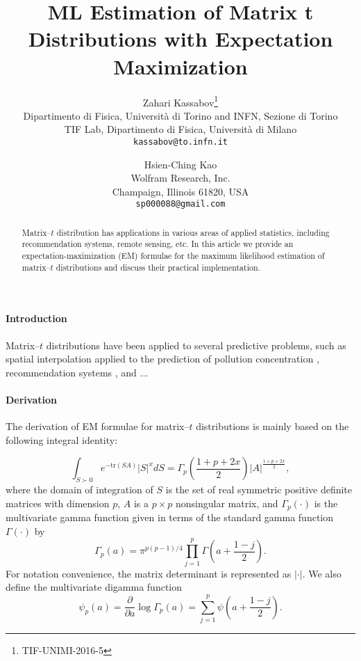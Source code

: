 \documentclass[english,listof=totoc]{scrartcl}
\title{ML Estimation of Matrix t Distributions with Expectation Maximization}
\author{Zahari Kassabov\thanks{TIF-UNIMI-2016-5}\\
        Dipartimento di Fisica, Universit\`a di Torino and INFN, Sezione di Torino\\
		TIF Lab, Dipartimento di Fisica, Universit\`a di Milano\\
        \texttt{kassabov@to.infn.it}\\
        \and
        Hsien-Ching Kao\\
        Wolfram Research, Inc.\\
		Champaign, Illinois 61820, USA\\
		\texttt{sp000088@gmail.com}
		}
\begin{document}
\maketitle

\begin{abstract}
Matrix--$t$ distribution has applications in various areas of applied statistics, including recommendation systems, remote sensing, etc. In this article we provide an expectation-maximization (EM) formulae for the maximum likelihood estimation of matrix--$t$ distributions and discuss their practical implementation.
\end{abstract}

\paragraph{Introduction}
Matrix--$t$ distributions have been applied to several predictive problems, such as spatial interpolation applied to the prediction of pollution concentration \cite{}, recommendation systems \cite{NIPS2007_3203}, and
...

\paragraph{Derivation}

The derivation of EM formulae for matrix--$t$ distributions is mainly based on the following integral identity:

\begin{equation}
\int_{S\succ 0}e^{-\textrm{tr}(SA)}|S|^{x}dS=\Gamma_{p}\left(\frac{1+p+2x}{2}\right)|A|^{\frac{1+p+2x}{2}},\label{eq:intmultgammadef}
\end{equation}
where the domain of integration of $S$ is the set of real symmetric positive definite
matrices with dimension $p$, $A$ is a $p\times p$ nonsingular matrix, and $\Gamma_{p}(\cdot)$ is the multivariate gamma function given in terms of the standard gamma function $\Gamma(\cdot)$ by
\begin{equation}
\Gamma_{p}(a)=\pi^{p(p-1)/4}\prod_{j=1}^{p}\Gamma\left(a+\frac{1-j}{2}\right).\label{eq:multgammadef}
\end{equation}
For notation convenience, the matrix determinant is represented as $|\cdot|$. We also define the multivariate digamma function
\begin{equation}
\psi_{p}(a)=\frac{\partial}{\partial a}\log\Gamma_{p}(a)=\sum_{j=1}^{p}\psi\left(a+\frac{1-j}{2}\right).
\end{equation}
\end{document}
